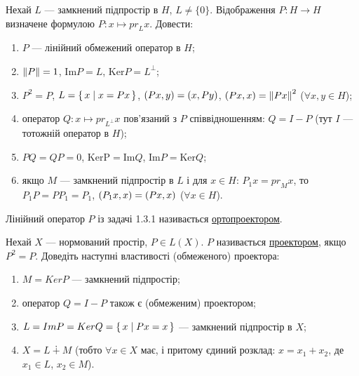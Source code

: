 
\begin{exercise}
    Нехай $L$ --- замкнений підпростір в $H$, $L \neq \{0\}$. 
    Відображення $P: H \rightarrow H$ визначене формулою 
    $P: x \mapsto {pr}_L x$. Довести:
    \begin{enumerate}[label=\ukr*)]
        \item $P$ --- лінійний обмежений оператор в $H$;
        \item $\left\lVert P\right\rVert = 1$, $\mathrm{Im}P = L$, $\mathrm{Ker} P = L^\bot$;
        \item $P^2 = P$, $L = \set{x \mid x=Px}$, $\left(Px, y\right)=\left(x, Py\right)$,
        $\left(Px, x\right) = \left\lVert Px\right\rVert^2$ ($\forall x,y \in H$);
        \item оператор $Q: x \mapsto {pr}_{L^\bot}x$ пов'язаний з $P$ 
        співвідношенням: $Q = I-P$ (тут $I$ --- тотожній оператор в $H$);
        \item $PQ = QP = 0$, $\mathrm{KerP} = \mathrm{Im}Q$, $\mathrm{Im}P = \mathrm{Ker}Q$;
        \item якщо $M$ --- замкнений підпростір в $L$ і для $x \in H$:
        $P_1 x = {pr}_M x$, то $P_1 P = P P_1 = P_1$,
        $\left(P_1x, x\right) = \left(Px, x\right)$ ($\forall x \in H$).
    \end{enumerate}
\end{exercise}

\begin{theory}
    Лінійний оператор $P$ із задачі 1.3.1 називається \uline{ортопроектором}.
\end{theory}

\begin{exercise}
    Нехай $X$ --- нормований простір, $P \in L(X)$.
    $P$ називається \uline{проектором}, якщо $P^2=P$. Доведіть наступні 
    властивості (обмеженого) проектора:
    \begin{enumerate}[label=\ukr*)]
        \item $M = KerP$ --- замкнений підпростір;
        \item оператор $Q = I - P$ також є (обмеженим) проектором;
        \item $L=ImP=KerQ=\set{x \mid Px=x}$ --- замкнений підпростір в $X$;
        \item $X = L \dotplus M$ (тобто $\forall x \in X$ має, і притому 
        єдиний розклад: $x=x_1+x_2$, де $x_1 \in L$, $x_2 \in M$).
    \end{enumerate}
\end{exercise}


